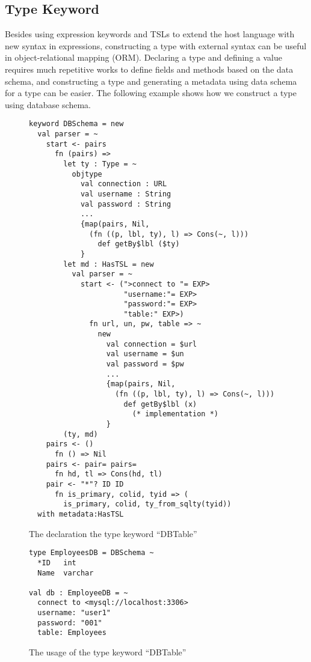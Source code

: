 \documentclass{sig-alternate}
\begin{document}
\subsection{Type Keyword}
Besides using expression keywords and TSLs to extend the host language with new syntax in expressions, constructing a type with external syntax can be useful in object-relational mapping (ORM). Declaring a type and defining a value requires much repetitive works to define fields and methods based on the data schema, and constructing a type and generating a metadata using data schema for a type can be easier. The following example shows how we construct a type using database schema.
\begin{figure}[ht]
\begin{lstlisting}[style=wyvern]
keyword DBSchema = new
  val parser = ~
    start <- pairs
      fn (pairs) =>
        let ty : Type = ~
          objtype
            val connection : URL
            val username : String
            val password : String
            ...
            {map(pairs, Nil, 
              (fn ((p, lbl, ty), l) => Cons(~, l)))
                def getBy$lbl ($ty)
            }
        let md : HasTSL = new 
          val parser = ~
            start <- (">connect to "= EXP>
                      "username:"= EXP>
                      "password:"= EXP>
                      "table:" EXP>)
              fn url, un, pw, table => ~
                new 
                  val connection = $url
                  val username = $un
                  val password = $pw
                  ...
                  {map(pairs, Nil, 
                    (fn ((p, lbl, ty), l) => Cons(~, l)))
                      def getBy$lbl (x) 
                        (* implementation *)
                  }
        (ty, md)
    pairs <- ()
      fn () => Nil 
    pairs <- pair= pairs=
      fn hd, tl => Cons(hd, tl)
    pair <- "*"? ID ID
      fn is_primary, colid, tyid => (
        is_primary, colid, ty_from_sqlty(tyid))
  with metadata:HasTSL
\end{lstlisting}
\vspace{-8px}
\caption{The declaration the type keyword ``DBTable''}
\vspace{-10px}
\label{typekw-example-1}
\end{figure}

\begin{figure}
\begin{lstlisting}[style=wyvern]
type EmployeesDB = DBSchema ~
  *ID   int
  Name  varchar

val db : EmployeeDB = ~
  connect to <mysql://localhost:3306>
  username: "user1"
  password: "001"
  table: Employees
\end{lstlisting}
\vspace{-8px}
\caption{The usage of the type keyword ``DBTable''}
\vspace{-10px}
\end{figure}
\end{document}
